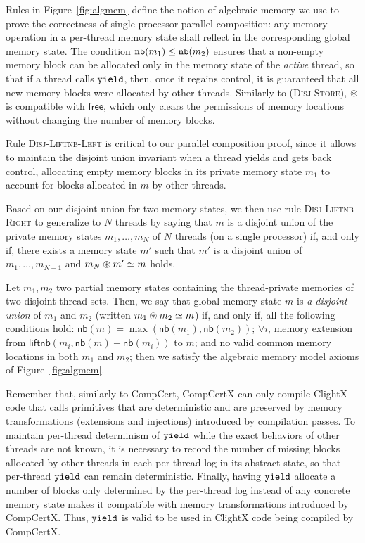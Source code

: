 Rules in Figure~\ref{fig:algmem} define the notion of algebraic memory
we use to prove the correctness of single-processor parallel
composition: any memory operation in a per-thread memory state shall
reflect in the corresponding global memory state. The condition
${\texttt{nb}}({m_1}) \leq {\texttt{nb}}({m_2})$ ensures that a non-empty memory
block can be allocated only in the memory state of the \emph{active}
thread, so that if a thread calls ${\texttt{yield}}$, then, once it regains
control, it is guaranteed that all new memory blocks were allocated by
other threads. Similarly to (\textsc{Disj-Store}), $\circledast$
is compatible with $\mathsf{free}$, which only clears the permissions
of memory locations without changing the number of memory blocks.

Rule \textsc{Disj-Liftnb-Left} is critical to our parallel composition
proof, since it allows to maintain the disjoint union invariant when a
thread yields and gets back control, allocating empty memory blocks in
its private memory state $m_1$ to account for blocks allocated in $m$
by other threads.

Based on our disjoint union for two memory states, we then use rule
\textsc{Disj-Liftnb-Right} to generalize to $N$ threads by saying that
$m$ is a disjoint union of the private memory states $m_1, \dots, m_N$
of $N$ threads (on a single processor) if, and only if, there exists a
memory state $m'$ such that $m'$ is a disjoint union of $m_1, \dots,
m_{N-1}$ and ${m_N} \circledast {m'} \simeq {m}$ holds.

\begin{lemma}
Let $m_1, m_2$ two partial memory states containing the thread-private memories of two disjoint thread sets. Then, we say that global memory state $m$ is \emph{a disjoint union} of $m_1$ and $m_2$ (written ${m_1} \circledast {m_2} \simeq {m}$) if, and only if, all the following conditions hold:
$\mathsf{nb}(m) = \max(\mathsf{nb}(m_1), \mathsf{nb}(m_2))$; $\forall i$, memory extension from $\mathsf{liftnb}(m_i, \mathsf{nb}(m) - \mathsf{nb}(m_i))$ to $m$; and no valid common memory locations in both $m_1$ and $m_2$; then we satisfy the algebraic memory model axioms of Figure~\ref{fig:algmem}.
\end{lemma}

Remember that, similarly to CompCert, CompCertX can only compile
ClightX code that calls primitives that are deterministic and are
preserved by memory transformations (extensions and injections)
introduced by compilation passes. To maintain per-thread determinism
of ${\texttt{yield}}$ while the exact behaviors of other threads are not
known, it is necessary to record the number of missing blocks
allocated by other threads in each per-thread log in its abstract
state, so that per-thread ${\texttt{yield}}$ can remain
deterministic. Finally, having ${\texttt{yield}}$ allocate a number of
blocks only determined by the per-thread log instead of any concrete
memory state makes it compatible with memory transformations
introduced by CompCertX. Thus, ${\texttt{yield}}$ is valid to be used in
ClightX code being compiled by CompCertX.
